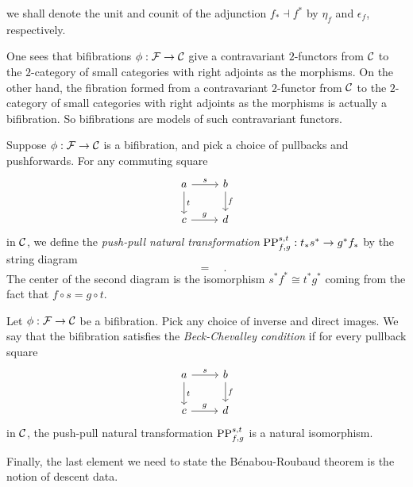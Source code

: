\documentclass{amsart}
\begin{document}
    we shall denote the unit and counit of the adjunction $f_\ast \dashv f^\ast$
    by $\eta_f$ and $\epsilon_f$, respectively.
\begin{remark}
    One sees that bifibrations $\phi: \mathcal F\to \mathcal C$ give a contravariant $2$-functors
        from $\mathcal C$ to the $2$-category of small categories with right adjoints as the morphisms.
    On the other hand, the fibration formed from a contravariant $2$-functor from $\mathcal C$
        to the $2$-category of small categories with right adjoints as the morphisms is actually a
        bifibration.
    So bifibrations are models of such contravariant functors.
\end{remark}
\begin{definition}
    Suppose $\phi:\mathcal F \to \mathcal C$ is a bifibration, and pick a choice of pullbacks and
        pushforwards.
    For any commuting square
    \[
        \begin{tikzcd}
            a \arrow[r,"s"] \arrow[d,"t"]& b \arrow[d,"f"] \\
            c \arrow[r,"g"] & d
        \end{tikzcd}
    \]
        in $\mathcal C$, we define the \emph{push-pull natural transformation}
        $\operatorname{PP}^{s,t}_{f,g}:t_\ast s^\ast \to g^\ast f_\ast$
        by the string diagram
    \[
        
        \quad=\quad
        
        .
    \]
    The center of the second diagram is the isomorphism $s^\ast f^\ast \cong t^\ast g^\ast$
        coming from the fact that $f\circ s = g\circ t$.
\end{definition}
\begin{definition}
    Let $\phi:\mathcal F\to \mathcal C$ be a bifibration.
    Pick any choice of inverse and direct images.
    We say that the bifibration satisfies the \emph{Beck-Chevalley condition}
        if for every pullback square 
    \[
        \begin{tikzcd}
            a \arrow[r,"s"] \arrow[d,"t"]& b \arrow[d,"f"] \\
            c \arrow[r,"g"] & d
        \end{tikzcd}
    \]
        in $\mathcal C$, the push-pull natural transformation $\operatorname{PP}^{s,t}_{f,g}$
        is a natural isomorphism.
\end{definition}
Finally, the last element we need to state the B\'enabou-Roubaud theorem is the notion
    of descent data.
\end{document}
